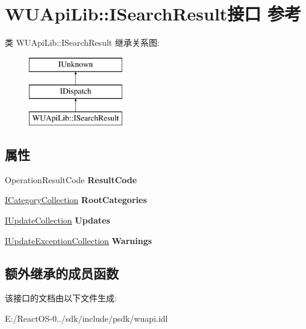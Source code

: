 \hypertarget{interface_w_u_api_lib_1_1_i_search_result}{}\section{W\+U\+Api\+Lib\+:\+:I\+Search\+Result接口 参考}
\label{interface_w_u_api_lib_1_1_i_search_result}
类 W\+U\+Api\+Lib\+:\+:I\+Search\+Result 继承关系图\+:\begin{figure}[H]
\begin{center}
\leavevmode
\includegraphics[height=3.000000cm]{interface_w_u_api_lib_1_1_i_search_result}
\end{center}
\end{figure}
\subsection*{属性}
\begin{DoxyCompactItemize}
\item 
\mbox{\label{interface_w_u_api_lib_1_1_i_search_result_a109a0f4091c5a3c2e24a437a99fdfed5}} 
Operation\+Result\+Code {\bfseries Result\+Code}
\item 
\mbox{\label{interface_w_u_api_lib_1_1_i_search_result_a3c747b4d060e46d92b99084b87583f47}} 
\hyperlink{interface_w_u_api_lib_1_1_i_category_collection}{I\+Category\+Collection} {\bfseries Root\+Categories}
\item 
\mbox{\label{interface_w_u_api_lib_1_1_i_search_result_ac07eeaf72649b6ec55c68d5b4e989a8b}} 
\hyperlink{interface_w_u_api_lib_1_1_i_update_collection}{I\+Update\+Collection} {\bfseries Updates}
\item 
\mbox{\label{interface_w_u_api_lib_1_1_i_search_result_a2450dafc6f4d3c631a7919e3e6d348de}} 
\hyperlink{interface_w_u_api_lib_1_1_i_update_exception_collection}{I\+Update\+Exception\+Collection} {\bfseries Warnings}
\end{DoxyCompactItemize}
\subsection*{额外继承的成员函数}


该接口的文档由以下文件生成\+:\begin{DoxyCompactItemize}
\item 
E\+:/\+React\+O\+S-\/0../sdk/include/psdk/wuapi.\+idl\end{DoxyCompactItemize}

